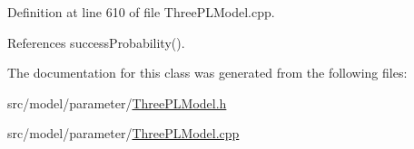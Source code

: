 Definition at line 610 of file Three\+P\+L\+Model.\+cpp.



References success\+Probability().



The documentation for this class was generated from the following files\+:\begin{DoxyCompactItemize}
\item 
src/model/parameter/\hyperlink{ThreePLModel_8h}{Three\+P\+L\+Model.\+h}\item 
src/model/parameter/\hyperlink{ThreePLModel_8cpp}{Three\+P\+L\+Model.\+cpp}\end{DoxyCompactItemize}
